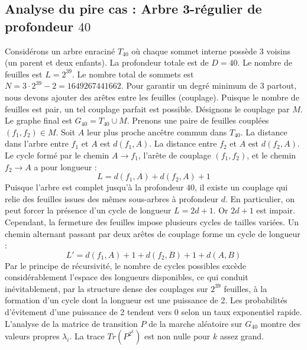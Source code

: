 \documentclass[11pt,a4paper]{article}
\begin{document}
\subsection{Analyse du pire cas : Arbre 3-régulier de profondeur $40$}
Considérons un arbre enraciné $T_{40}$ où chaque sommet interne possède 3 voisins (un parent et deux enfants).
La profondeur totale est de $D = 40$.
Le nombre de feuilles est $L = 2^{39}$.
Le nombre total de sommets est $N = 3 \cdot 2^{39} - 2 = 1649267441662$.
Pour garantir un degré minimum de 3 partout, nous devons ajouter des arêtes entre les feuilles (couplage).
Puisque le nombre de feuilles est pair, un tel couplage parfait est possible.
Désignons le couplage par $M$. Le graphe final est $G_{40} = T_{40} \cup M$.
Prenons une paire de feuilles couplées $(f_1, f_2) \in M$.
Soit $A$ leur plus proche ancêtre commun dans $T_{40}$.
La distance dans l'arbre entre $f_1$ et $A$ est $d(f_1, A)$.
La distance entre $f_2$ et $A$ est $d(f_2, A)$.
Le cycle formé par le chemin $A \to f_1$, l'arête de couplage $(f_1, f_2)$, et le chemin $f_2 \to A$ a pour longueur :
$$ L = d(f_1, A) + d(f_2, A) + 1 $$
Puisque l'arbre est complet jusqu'à la profondeur $40$, il existe un couplage qui relie des feuilles issues des mêmes sous-arbres à profondeur $d$.
En particulier, on peut forcer la présence d'un cycle de longueur $L = 2d + 1$. Or $2d+1$ est impair.
Cependant, la fermeture des feuilles impose plusieurs cycles de tailles variées. Un chemin alternant passant par deux arêtes de couplage forme un cycle de longueur :
$$ L' = d(f_1, A) + 1 + d(f_2, B) + 1 + d(A, B) $$
Par le principe de récursivité, le nombre de cycles possibles excède considérablement l'espace des longueurs disponibles, ce qui conduit inévitablement, par la structure dense des couplages sur $2^{39}$ feuilles, à la formation d'un cycle dont la longueur est une puissance de 2. Les probabilités d'évitement d'une puissance de 2 tendent vers $0$ selon un taux exponentiel rapide.
L'analyse de la matrice de transition $P$ de la marche aléatoire sur $G_{40}$ montre des valeurs propres $\lambda_i$. La trace $Tr(P^{2^k})$ est non nulle pour $k$ assez grand.
\end{document}
